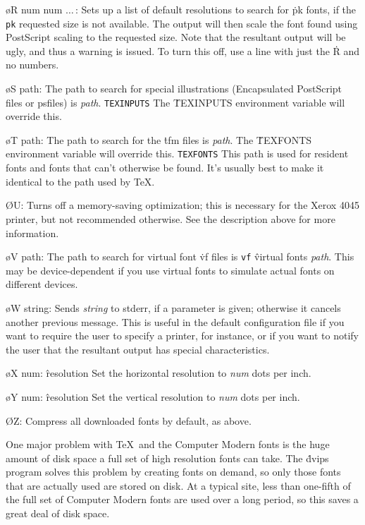 {\o R num num $\ldots\,$:
Sets up a list of default resolutions to search for \.{pk} fonts, if the
\^{{\tt pk}}
requested size is not available.  The output will then scale the font
found using PostScript scaling to the requested size.  Note that the
resultant output will be ugly, and thus a warning is issued.  To turn
this off, use a line with just the \.{R} and no numbers.

\o S path:  The path to search for special illustrations
(Encapsulated PostScript files or psfiles) is {\it path}.
\^{{\tt TEXINPUTS}}
The \.{TEXINPUTS} environment variable will override this.

\o T path: The path to search for the \.{tfm} files is
{\it path}.  The \.{TEXFONTS} environment variable will override this.
\^{{\tt TEXFONTS}}
This path is used for resident fonts and fonts that can't otherwise be found.
It's usually best to make it identical to the path used by \TeX.

\O U:  Turns off a memory-saving optimization; this is necessary for the
Xerox 4045 printer, but not recommended otherwise.  See the description
above for more information.

\o V path:  The path to search for virtual font \.{vf} files is
\^{{\tt vf}}
\^{virtual fonts}
{\it path}.
This may be device-dependent if you use virtual fonts to simulate
actual fonts on different devices.

\o W string:
Sends {\it string} to stderr, if a parameter is given; otherwise it cancels
another previous  message.
This is useful in the default configuration file if you want to require
the user to specify a printer, for instance, or if you want to notify
the user that the resultant output has special characteristics.

\o X num:
\^{resolution}
Set the horizontal resolution to {\it num} dots per inch.

\o Y num:
\^{resolution}
Set the vertical resolution to {\it num} dots per inch.

\O Z:  Compress all downloaded fonts by default, as above.\par}


One major problem with \TeX\ and the Computer Modern fonts is the huge
amount of disk space a full set of high resolution fonts can take.  The
\.{dvips} program solves this problem by creating fonts on demand, so only
those fonts that are actually used are stored on disk.	At a typical site,
less than one-fifth of the full set of Computer Modern fonts are used over
a long period, so this saves a great deal of disk space.

